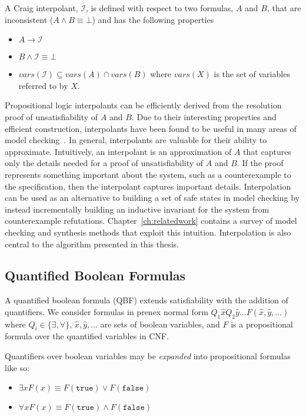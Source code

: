 A Craig interpolant, $\mathcal{I}$, is defined with respect to two formulas, $A$ and $B$, that are inconsistent ($A \land B \equiv \bot$) and has the following properties

\begin{itemize}
    \item $A \to \mathcal{I}$
    \item $B \land \mathcal{I} \equiv \bot$
    \item $vars(\mathcal{I}) \subseteq vars(A) \cap vars(B)$ where $vars(X)$ is the set of variables referred to by $X$.
\end{itemize}

Propositional logic interpolants can be efficiently derived from the resolution proof of unsatisfiability of $A$ and $B$. Due to their interesting properties and efficient construction, interpolants have been found to be useful in many areas of model checking~\cite{McMillan05}. In general, interpolants are valuable for their ability to approximate. Intuitively, an interpolant is an approximation of $A$ that captures only the details needed for a proof of unsatisfiability of $A$ and $B$. If the proof represents something important about the system, such as a counterexample to the specification, then the interpolant captures important details.  Interpolation can be used as an alternative to building a set of safe states in model checking by instead incrementally building an inductive invariant for the system from counterexample refutations. Chapter~\ref{ch:relatedwork} contains a survey of model checking and synthesis methods that exploit this intuition. Interpolation is also central to the algorithm presented in this thesis.

\subsection{Quantified Boolean Formulas}
\label{sec:backgroundQBF}

A quantified boolean formula (QBF) extends satisfiability with the addition of quantifiers. We consider formulas in prenex normal form $Q_1 \hat{x} Q_2 \hat{y} ... F(\hat{x}, \hat{y}, ...)$ where $Q_i \in \{ \exists, \forall \}$, $\hat{x}, \hat{y}, ...$ are sets of boolean variables, and $F$ is a propositional formula over the quantified variables in CNF.

Quantifiers over boolean variables may be \emph{expanded} into propositional formulas like so:

\begin{itemize}
    \item $\exists x F(x) \equiv F(\texttt{true}) \lor F(\texttt{false})$
    \item $\forall x F(x) \equiv F(\texttt{true}) \land F(\texttt{false})$
\end{itemize}

